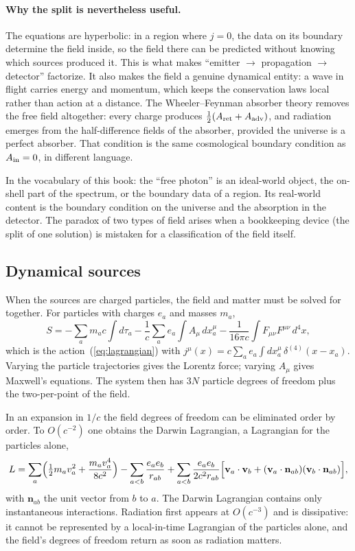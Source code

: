 \documentclass[11pt,a4paper]{book}
\begin{document}
\paragraph{Why the split is nevertheless useful.} The equations are hyperbolic: in a region where $j=0$, the
data on its boundary determine the field inside, so the field there can be predicted without knowing which
sources produced it. This is what makes ``emitter $\to$ propagation $\to$ detector'' factorize. It also makes the
field a genuine dynamical entity: a wave in flight carries energy and momentum, which keeps the conservation laws
local rather than action at a distance. The Wheeler--Feynman absorber theory removes the free field altogether:
every charge produces $\tfrac12(A_{\rm ret}+A_{\rm adv})$, and radiation emerges from the half-difference fields
of the absorber, provided the universe is a perfect absorber. That condition is the same cosmological boundary
condition as $A_{\rm in}=0$, in different language.

In the vocabulary of this book: the ``free photon'' is an ideal-world object, the on-shell part of the
spectrum, or the boundary data of a region. Its real-world content is the boundary condition on the universe and the
absorption in the detector. The paradox of two types of field arises when a bookkeeping device (the split of one
solution) is mistaken for a classification of the field itself.

\subsection{Dynamical sources}

When the sources are charged particles, the field and matter must be solved for together. For
particles with charges $e_a$ and masses $m_a$,
\begin{equation}
S=-\sum_a m_ac\!\int\! d\tau_a-\frac1c\sum_a e_a\!\int\! A_\mu\,dx_a^\mu-\frac1{16\pi c}\!\int\!F_{\mu\nu}F^{\mu\nu}\,d^4x ,
\end{equation}
which is the action~(\ref{eq:lagrangian}) with
$j^\mu(x)=c\sum_a e_a\int dx_a^\mu\,\delta^{(4)}(x-x_a)$. Varying the particle trajectories gives
the Lorentz force; varying $A_\mu$ gives Maxwell's equations. The system then has $3N$ particle
degrees of freedom plus the two-per-point of the field.

In an expansion in $1/c$ the field degrees of freedom can be eliminated order by order. To
$O(c^{-2})$ one obtains the Darwin Lagrangian, a Lagrangian for the particles alone,
\begin{equation}
L=\sum_a\Bigl(\tfrac12m_av_a^2+\frac{m_av_a^4}{8c^2}\Bigr)
-\sum_{a<b}\frac{e_ae_b}{r_{ab}}
+\sum_{a<b}\frac{e_ae_b}{2c^2r_{ab}}\Bigl[\mathbf v_a\cdot\mathbf v_b+(\mathbf v_a\cdot\mathbf n_{ab})(\mathbf v_b\cdot\mathbf n_{ab})\Bigr],
\end{equation}
with $\mathbf n_{ab}$ the unit vector from $b$ to $a$. The Darwin
Lagrangian contains only instantaneous interactions. Radiation first appears at $O(c^{-3})$ and
is dissipative: it cannot be represented by a local-in-time Lagrangian of the particles alone,
and the field's degrees of freedom return as soon as radiation matters.
\end{document}
